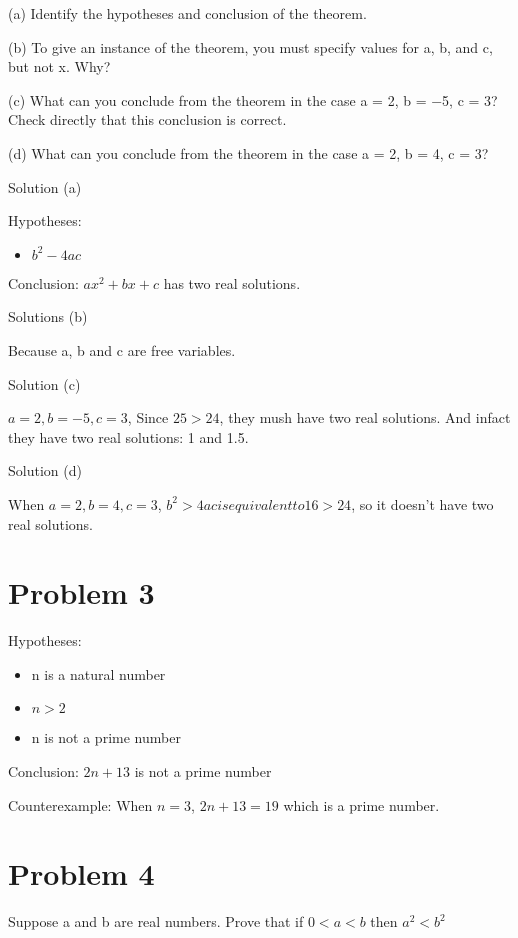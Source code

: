 \documentclass{article}
\begin{document}
(a) Identify the hypotheses and conclusion of the theorem.

(b) To give an instance of the theorem, you must specify values for a, b,
and c, but not x. Why?

(c) What can you conclude from the theorem in the case a = 2, b = −5,
c = 3? Check directly that this conclusion is correct.

(d) What can you conclude from the theorem in the case a = 2, b = 4, c
= 3?

Solution (a)

Hypotheses:
\begin{itemize}
\item $b^2 - 4ac$
\end{itemize}

Conclusion: $ax^2 + bx + c$ has two real solutions.

Solutions (b)

Because a, b and c are free variables.

Solution (c)

$a = 2, b = -5, c=3$, Since $25 > 24$, they mush have two real
solutions. And infact they have two real solutions: 1 and 1.5.

Solution (d)

When $a =2, b=4, c=3$, $b^2 > 4ac is equivalent to 16 > 24$, so it
doesn't have two real solutions.

\section{Problem 3}

Hypotheses:
\begin{itemize}
\item n is a natural number
\item $n > 2$
\item n is not a prime number
\end{itemize}

Conclusion: $2n + 13$ is not a prime number

Counterexample: When $n = 3$, $2n + 13 = 19$ which is a prime number.

\section{Problem 4}

Suppose a and b are real numbers. Prove that if $0 < a < b$ then $a^2 <
b^2$

\end{document}

